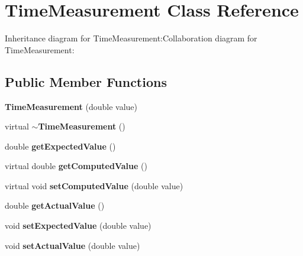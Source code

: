 \section{TimeMeasurement Class Reference}
\label{classbr_1_1pucrio_1_1telemidia_1_1ginga_1_1ncl_1_1model_1_1time_1_1TimeMeasurement}
Inheritance diagram for TimeMeasurement:Collaboration diagram for TimeMeasurement:\subsection*{Public Member Functions}
\begin{CompactItemize}
\item 
\textbf{TimeMeasurement} (double value)\label{classbr_1_1pucrio_1_1telemidia_1_1ginga_1_1ncl_1_1model_1_1time_1_1TimeMeasurement_5c3fa6f06f7394c6aec16ea344d30d7a}

\item 
virtual {\bf $\sim$TimeMeasurement} ()\label{classbr_1_1pucrio_1_1telemidia_1_1ginga_1_1ncl_1_1model_1_1time_1_1TimeMeasurement_0fdb0d68f1e1beb582f882c33b7c1650}

\item 
double \textbf{getExpectedValue} ()\label{classbr_1_1pucrio_1_1telemidia_1_1ginga_1_1ncl_1_1model_1_1time_1_1TimeMeasurement_e98cb9929307aed7d3487a2818001ffe}

\item 
virtual double \textbf{getComputedValue} ()\label{classbr_1_1pucrio_1_1telemidia_1_1ginga_1_1ncl_1_1model_1_1time_1_1TimeMeasurement_94d1dab3f66c78a620041bff5d4260b4}

\item 
virtual void {\bf setComputedValue} (double value)\label{classbr_1_1pucrio_1_1telemidia_1_1ginga_1_1ncl_1_1model_1_1time_1_1TimeMeasurement_1831bccf6ad0b5f8c17b2a39ced7da24}

\item 
double \textbf{getActualValue} ()\label{classbr_1_1pucrio_1_1telemidia_1_1ginga_1_1ncl_1_1model_1_1time_1_1TimeMeasurement_5a706ca47ab3359181c6c30363bec268}

\item 
void \textbf{setExpectedValue} (double value)\label{classbr_1_1pucrio_1_1telemidia_1_1ginga_1_1ncl_1_1model_1_1time_1_1TimeMeasurement_8fdfd57b96a4f467802779d16c42cc70}

\item 
void \textbf{setActualValue} (double value)\label{classbr_1_1pucrio_1_1telemidia_1_1ginga_1_1ncl_1_1model_1_1time_1_1TimeMeasurement_a8c85de3e0ce088378a343617a3e5c26}


\end{CompactItemize}

